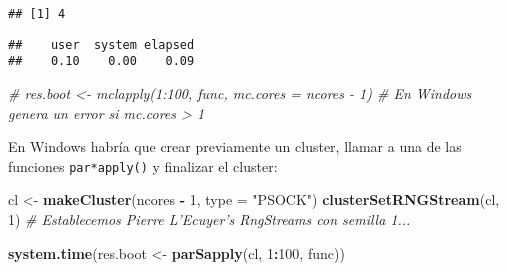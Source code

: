 \documentclass[]{book}
\newenvironment{Shaded}{\begin{snugshade}}{\end{snugshade}}
\newcommand{\KeywordTok}[1]{\textcolor[rgb]{0.13,0.29,0.53}{\textbf{#1}}}
\newcommand{\DataTypeTok}[1]{\textcolor[rgb]{0.13,0.29,0.53}{#1}}
\newcommand{\DecValTok}[1]{\textcolor[rgb]{0.00,0.00,0.81}{#1}}
\newcommand{\StringTok}[1]{\textcolor[rgb]{0.31,0.60,0.02}{#1}}
\newcommand{\CommentTok}[1]{\textcolor[rgb]{0.56,0.35,0.01}{\textit{#1}}}
\newcommand{\OtherTok}[1]{\textcolor[rgb]{0.56,0.35,0.01}{#1}}
\newcommand{\ControlFlowTok}[1]{\textcolor[rgb]{0.13,0.29,0.53}{\textbf{#1}}}
\newcommand{\OperatorTok}[1]{\textcolor[rgb]{0.81,0.36,0.00}{\textbf{#1}}}
\newcommand{\NormalTok}[1]{#1}
\theoremstyle{break}
\theoremstyle{definition}
\theoremstyle{definition}
\theoremstyle{definition}
\theoremstyle{remark}
\begin{document}
\begin{verbatim}
## [1] 4
\end{verbatim}

\begin{Shaded}
\end{Shaded}

\begin{verbatim}
##    user  system elapsed 
##    0.10    0.00    0.09
\end{verbatim}

\begin{Shaded}
\begin{Highlighting}[]
\CommentTok{# res.boot <- mclapply(1:100, func, mc.cores = ncores - 1) # En Windows genera un error si mc.cores > 1}
\end{Highlighting}
\end{Shaded}

En Windows habría que crear previamente un cluster, llamar a una de las
funciones \texttt{par*apply()} y finalizar el cluster:

\begin{Shaded}
\begin{Highlighting}[]
\NormalTok{cl <-}\StringTok{ }\KeywordTok{makeCluster}\NormalTok{(ncores }\OperatorTok{-}\StringTok{ }\DecValTok{1}\NormalTok{, }\DataTypeTok{type =} \StringTok{"PSOCK"}\NormalTok{)}
\KeywordTok{clusterSetRNGStream}\NormalTok{(cl, }\DecValTok{1}\NormalTok{) }\CommentTok{# Establecemos Pierre L'Ecuyer's RngStreams con semilla 1...}

\KeywordTok{system.time}\NormalTok{(res.boot <-}\StringTok{ }\KeywordTok{parSapply}\NormalTok{(cl, }\DecValTok{1}\OperatorTok{:}\DecValTok{100}\NormalTok{, func))}
\end{Highlighting}
\end{Shaded}
\end{document}
